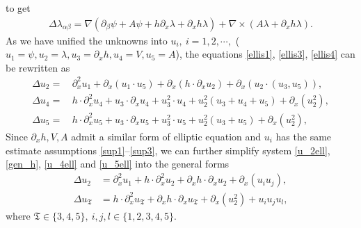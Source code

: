 \documentclass[11pt,letterpaper,reqno]{amsart}
\numberwithin{equation}{section}
\theoremstyle{definition}
\theoremstyle{remark}
\begin{document}
 to get
 \begin{align}
 	\Delta \lambda_{\alpha \beta}= \nabla \left( \partial_\beta \psi+A \psi+h \partial_x \lambda+\partial_x h \lambda\right) +\nabla \times \left( A \lambda+\partial_x h \lambda \right). \label{ellis1}
 \end{align}
As we have unified the unknowns into $u_i,\ i=1, 2, \cdots,$ ($ u_1=\psi, u_2=\lambda,u_3=\partial_x h,  u_4=  V, u_5= A $), the equations \eqref{ellis1}, \eqref{ellis3}, \eqref{ellis4} can be rewritten as 
\begin{align}
	\Delta u_2=&\, \partial_x^2 u_1 +\partial_x (u_1 \cdot u_5)+\partial_x (h \cdot \partial_x u_2)+\partial_x (u_2 \cdot (u_3,u_5)) , \label{u_2ell}\\
	\Delta u_4=&\, h\cdot \partial_x^2  u_4 +u_3\cdot \partial_x u_4+u_3^2\cdot u_4+u_2^2 (u_3+u_4+u_5)+\partial_x (u_2^2),\label{u_4ell}\\
    \Delta u_5 =&\,h \cdot\partial_x^2 u_5+u_3 \cdot \partial_x u_5 +u_3^2\cdot  u_5+u_2^2 (u_3+u_5)+\partial_x (u_2^2),\label{u_5ell}
\end{align}
Since $ \partial_x h, V, A $ admit a similar form of elliptic equation and $ u_i $ has the same estimate assumptions \eqref{sup1}--\eqref{sup3}, we can further simplify system \eqref{u_2ell}, \eqref{gen_h},  \eqref{u_4ell} and \eqref{u_5ell}  into the general forms
\begin{align}
	\Delta u_{2}
	&=\partial_x^2 u_1+h \cdot\partial_x^2 u_{2}+ \partial_x h \cdot\partial_x u_{2}+\partial_x(u_i  u_j), \label{Gen_u2}\\	
	\Delta u_{\mathfrak{T}}
	&=h\cdot\partial_x^2 u_{\mathfrak{T}}+ \partial_x h \cdot \partial_x u_\mathfrak{T}+\partial_x(u_2^2)+u_i u_j u_l,  \label{Gen_ellev}
\end{align}
where $\mathfrak{T}\in\{3,4,5\},\ i,j,l\in\{1,2,3,4,5\} $.
\end{document}

